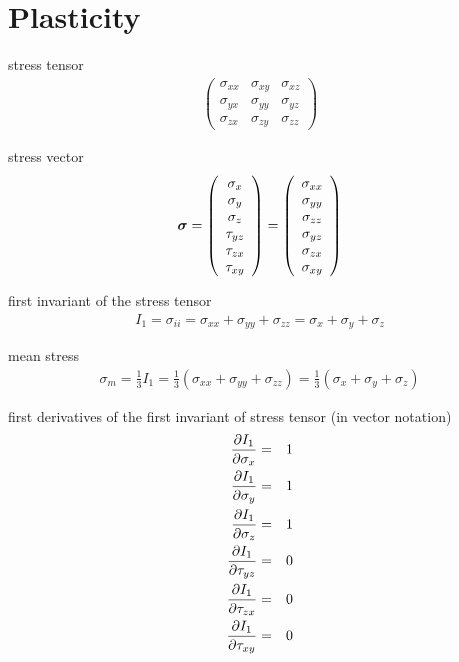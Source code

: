 \chapter{Plasticity}

stress tensor
\begin{eqnarray}
\left(\begin{array}{ccc}
\sigma_{xx} & \sigma_{xy} & \sigma_{xz}
\\
\sigma_{yx} & \sigma_{yy} & \sigma_{yz}
\\
\sigma_{zx} & \sigma_{zy} & \sigma_{zz}
\end{array}\right)
\end{eqnarray}

stress vector
\begin{eqnarray}
\mbox{\boldmath$\sigma$} = \left(\begin{array}{c}
\sigma_x
\\
\sigma_y
\\
\sigma_z
\\
\tau_{yz}
\\
\tau_{zx}
\\
\tau_{xy}
\end{array}\right) = \left(\begin{array}{c}
\sigma_{xx}
\\
\sigma_{yy}
\\
\sigma_{zz}
\\
\sigma_{yz}
\\
\sigma_{zx}
\\
\sigma_{xy}
\end{array}\right)
\end{eqnarray}


first invariant of the stress tensor
\begin{eqnarray}
I_1 = \sigma_{ii} = \sigma_{xx} + \sigma_{yy} + \sigma_{zz} = \sigma_x + \sigma_y + \sigma_z
\end{eqnarray}

mean stress
\begin{eqnarray}
\sigma_m = \frac{1}{3} I_1 = \frac{1}{3}(\sigma_{xx} + \sigma_{yy} + \sigma_{zz}) = \frac{1}{3}(\sigma_x + \sigma_y + \sigma_z)
\end{eqnarray}

first derivatives of the first invariant of stress tensor (in vector notation)
\begin{eqnarray}
\mbox{$\displaystyle\frac{\partial{I_1}}{\partial{\sigma_x}}$} &=& 1
\\
\mbox{$\displaystyle\frac{\partial{I_1}}{\partial{\sigma_y}}$} &=& 1
\\
\mbox{$\displaystyle\frac{\partial{I_1}}{\partial{\sigma_z}}$} &=& 1
\\
\mbox{$\displaystyle\frac{\partial{I_1}}{\partial{\tau_{yz}}}$} &=& 0
\\
\mbox{$\displaystyle\frac{\partial{I_1}}{\partial{\tau_{zx}}}$} &=& 0
\\
\mbox{$\displaystyle\frac{\partial{I_1}}{\partial{\tau_{xy}}}$} &=& 0
\\
\end{eqnarray}

